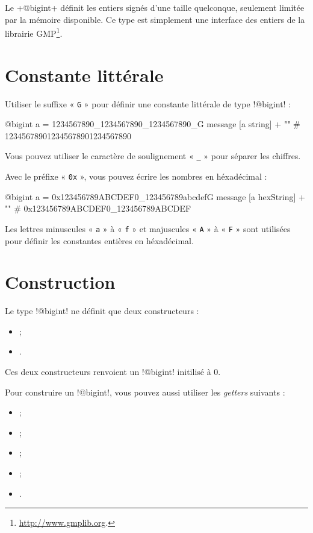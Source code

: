 

Le \ggs+@bigint+ définit les entiers signés d'une taille quelconque, seulement limitée par la mémoire disponible. Ce type est simplement une interface des entiers de la librairie GMP\footnote{\url{http://www.gmplib.org}.}.

\section{Constante littérale}

Utiliser le suffixe « \texttt{G} » pour définir une constante littérale de type \ggs!@bigint! :
\begin{galgas}
@bigint a = 1234567890_1234567890_1234567890_G
message [a string] + "\n" # 123456789012345678901234567890
\end{galgas}

Vous pouvez utiliser le caractère de soulignement « \texttt{\_} » pour séparer les chiffres.

Avec le préfixe « \texttt{0x} », vous pouvez écrire les nombres en héxadécimal :
\begin{galgas}
@bigint a = 0x123456789ABCDEF0_123456789abcdefG
message [a hexString] + "\n" # 0x123456789ABCDEF0_123456789ABCDEF
\end{galgas}

Les lettres minuscules « \texttt{a} » à « \texttt{f} » et majuscules « \texttt{A} » à « \texttt{F} » sont utilisées pour définir les constantes entières en héxadécimal.

\section{Construction}

Le type \ggs!@bigint! ne définit que deux constructeurs :
\begin{itemize}
  \item {} ;
  \item {}.
\end{itemize}

Ces deux constructeurs renvoient un \ggs!@bigint! initilisé à $0$.

Pour construire un \ggs!@bigint!, vous pouvez aussi utiliser les \emph{getters} suivants :
\begin{itemize}
  \item {} ;
  \item {} ;
  \item {} ;
  \item {} ;
  \item {}.
\end{itemize}

